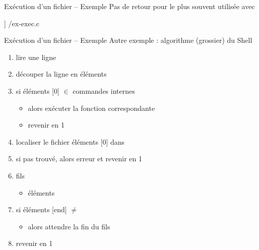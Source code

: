 \begin {frame} {Exécution d'un fichier -- Exemple}
    Pas de retour pour  \implique le plus souvent utilisée
    avec 

    \vspace* {3mm}

    \fD\lstmonstyle] {\inc/ex-exec.c}
\end {frame}

\begin {frame} {Exécution d'un fichier -- Exemple}
    Autre exemple : algorithme (grossier) du Shell

    \begin {enumerate}
	\item lire une ligne
	\item découper la ligne en éléments
	\item si éléments [0] $\in$ commandes internes
	    \begin {itemize}
		\item alors exécuter la fonction correspondante
		\item revenir en 1
	    \end {itemize}
	\item localiser le fichier éléments [0] dans 
	\item si pas trouvé, alors erreur et revenir en 1
	\item {} \implique fils
	    \begin {itemize}
		\item {} éléments \code {)}
	    \end {itemize}
	\item si éléments [end] $\neq$ \code {\&}
	    \begin {itemize}
		\item alors attendre la fin du fils
	    \end {itemize}
	\item revenir en 1
    \end {enumerate}
\end {frame}

